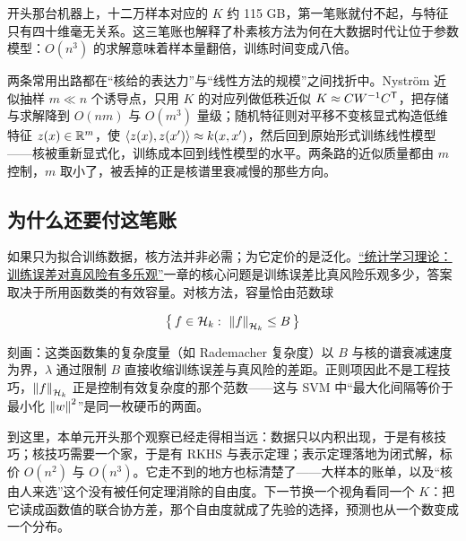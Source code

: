 开头那台机器上，十二万样本对应的 \(K\) 约 115 GB，第一笔账就付不起，与特征只有四十维毫无关系。这三笔账也解释了朴素核方法为何在大数据时代让位于参数模型：\(O(n^{3})\) 的求解意味着样本量翻倍，训练时间变成八倍。

两条常用出路都在``核给的表达力''与``线性方法的规模''之间找折中。Nyström 近似抽样 \(m\ll n\) 个诱导点，只用 \(K\) 的对应列做低秩近似 \(K\approx CW^{-1}C^{\mathsf{T}}\)，把存储与求解降到 \(O(nm)\) 与 \(O(m^{3})\) 量级；随机特征则对平移不变核显式构造低维特征 \(z(x)\in\mathbb{R}^{m}\)，使 \(\left\langle z(x),z(x')\right\rangle\approx k(x,x')\)，然后回到原始形式训练线性模型——核被重新显式化，训练成本回到线性模型的水平。两条路的近似质量都由 \(m\) 控制，\(m\) 取小了，被丢掉的正是核谱里衰减慢的那些方向。

\subsection{为什么还要付这笔账}

如果只为拟合训练数据，核方法并非必需；为它定价的是泛化。\hyperref[ch:118]{``统计学习理论：训练误差对真风险有多乐观''}一章的核心问题是训练误差比真风险乐观多少，答案取决于所用函数类的有效容量。对核方法，容量恰由范数球

\[
\bigl\{\,f\in\mathcal{H}_k:\ \norm{f}_{\mathcal{H}_k}\le B\,\bigr\}
\]

刻画：这类函数集的复杂度量（如 Rademacher 复杂度）以 \(B\) 与核的谱衰减速度为界，\(\lambda\) 通过限制 \(B\) 直接收缩训练误差与真风险的差距。正则项因此不是工程技巧，\(\left\lVert f\right\rVert_{\mathcal{H}_k}\) 正是控制有效复杂度的那个范数——这与 SVM 中``最大化间隔等价于最小化 \(\left\lVert w\right\rVert^{2}\)''是同一枚硬币的两面。

到这里，本单元开头那个观察已经走得相当远：数据只以内积出现，于是有核技巧；核技巧需要一个家，于是有 RKHS 与表示定理；表示定理落地为闭式解，标价 \(O(n^{2})\) 与 \(O(n^{3})\)。它走不到的地方也标清楚了——大样本的账单，以及``核由人来选''这个没有被任何定理消除的自由度。下一节换一个视角看同一个 \(K\)：把它读成函数值的联合协方差，那个自由度就成了先验的选择，预测也从一个数变成一个分布。
